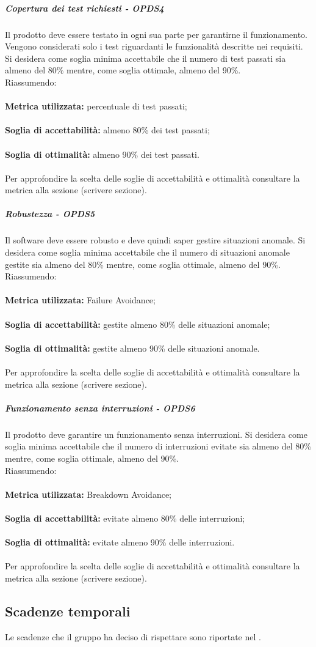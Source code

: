 \documentclass[PianoDiQualifica.tex]{subfiles}
\begin{document}
				\subparagraph{Copertura dei test richiesti - OPDS4}
				Il prodotto deve essere testato in ogni sua parte per garantirne il funzionamento. Vengono considerati solo i test riguardanti le funzionalità descritte nei requisiti.
				Si desidera come soglia minima accettabile che il numero di test passati sia almeno del 80\% mentre, come soglia ottimale, almeno del 90\%. \\
				Riassumendo: \\ \\
				\textbf{Metrica utilizzata:} percentuale di test passati;\\ \\
				\textbf{Soglia di accettabilità:} almeno 80\% dei test passati; \\ \\
				\textbf{Soglia di ottimalità:} almeno 90\% dei test passati. \\ \\
				Per approfondire la scelta delle soglie di accettabilità e ottimalità consultare la metrica alla sezione (scrivere sezione).
				
				\subparagraph{Robustezza - OPDS5}
				Il software deve essere robusto e deve quindi saper gestire situazioni anomale.
				Si desidera come soglia minima accettabile che il numero di situazioni anomale gestite sia almeno del 80\% mentre, come soglia ottimale, almeno del 90\%. \\
				Riassumendo: \\ \\
				\textbf{Metrica utilizzata:} Failure Avoidance;\\ \\
				\textbf{Soglia di accettabilità:} gestite almeno 80\% delle situazioni anomale; \\ \\
				\textbf{Soglia di ottimalità:} gestite almeno 90\% delle situazioni anomale. \\ \\
				Per approfondire la scelta delle soglie di accettabilità e ottimalità consultare la metrica alla sezione (scrivere sezione).
				
				\subparagraph{Funzionamento senza interruzioni - OPDS6}
				Il prodotto deve garantire un funzionamento senza interruzioni.
				Si desidera come soglia minima accettabile che il numero di interruzioni evitate sia almeno del 80\% mentre, come soglia ottimale, almeno del 90\%. \\
				Riassumendo: \\ \\
				\textbf{Metrica utilizzata:} Breakdown Avoidance;\\ \\
				\textbf{Soglia di accettabilità:} evitate almeno 80\% delle interruzioni; \\ \\
				\textbf{Soglia di ottimalità:} evitate almeno 90\% delle interruzioni. \\ \\
				Per approfondire la scelta delle soglie di accettabilità e ottimalità consultare la metrica alla sezione (scrivere sezione).
				
		\subsection{Scadenze temporali}
		Le scadenze che il gruppo \GRUPPO{} ha deciso di rispettare sono riportate nel \PPdocRR{}.
				
\end{document}
